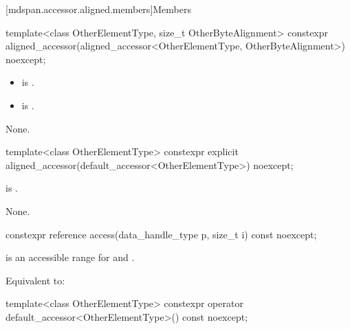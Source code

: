 [mdspan.accessor.aligned.members]{Members}

%
\begin{itemdecl}
template<class OtherElementType, size_t OtherByteAlignment>
  constexpr aligned_accessor(aligned_accessor<OtherElementType, OtherByteAlignment>) noexcept;
\end{itemdecl}

\begin{itemdescr}
\pnum
\constraints
\begin{itemize}
\item
{}
is .
\item
{} is .
\end{itemize}

\pnum
\effects
None.
\end{itemdescr}

%
\begin{itemdecl}
template<class OtherElementType>
  constexpr explicit aligned_accessor(default_accessor<OtherElementType>) noexcept;
\end{itemdecl}

\begin{itemdescr}
\pnum
\constraints
{}
is .

\pnum
\effects
None.
\end{itemdescr}

%
\begin{itemdecl}
constexpr reference access(data_handle_type p, size_t i) const noexcept;
\end{itemdecl}

\begin{itemdescr}
\pnum
\expects
{} is an accessible range for  and .

\pnum
\effects
Equivalent to: 
\end{itemdescr}

%
\begin{itemdecl}
template<class OtherElementType>
  constexpr operator default_accessor<OtherElementType>() const noexcept;
\end{itemdecl}

